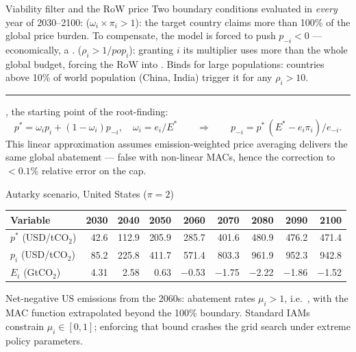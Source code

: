 \documentclass[aspectratio=169,xcolor=dvipsnames, 11pt,mathserif]{beamer}
\newcommand{\eed}{\ee\vspace{-\dimexpr 2\topsep+\parskip+\medskipamount-3pt\relax}}
\begin{document}
\begin{frame}{Viability filter and the RoW price \label{viability} \hyperlink{scenarios}{}}
\bbvs
\ip Two boundary conditions evaluated in \textit{every} year of 2030--2100:
\ip {} ($\omega_i\times\pi_i>1$): the target country claims more than 100\% of the global price burden. To compensate, the model is forced to push $p_{-i}<0$ --- economically, a .
\ip {} ($\rho_i>1/pop_i$): granting $i$ its multiplier uses more than the whole global budget, forcing the RoW into . Binds for large populations: countries above 10\% of world population (China, India) trigger it for any $\rho_i>10$.
\ip \rule{\linewidth}{0.4pt}
\ip {}, the starting point of the root-finding:
\[ p^* = \omega_i p_i + (1-\omega_i)p_{-i}, \quad \omega_i = e_i/E^* \qquad\Longrightarrow\qquad p_{-i} = p^*\,(E^*-e_i\pi_i)/e_{-i}. \]
\eed
\bbvs
\ip This linear approximation assumes emission-weighted price averaging delivers the same global abatement --- false with non-linear MACs, hence the  correction to $<0.1\%$ relative error on the cap.
\ee
\end{frame}


\begin{frame}{Autarky scenario, United States ($\pi=2$) \hyperlink{scenarios}{}}
\vspace{.4cm}
\centering
\renewcommand{\arraystretch}{1.4}
\begin{tabular}{lrrrrrrrr}
  \toprule
  \textbf{Variable} & \textbf{2030} & \textbf{2040} & \textbf{2050} & \textbf{2060} & \textbf{2070} & \textbf{2080} & \textbf{2090} & \textbf{2100} \\
  \midrule
  $p^*$ (USD/tCO$_2$) & 42.6 & 112.9 & 205.9 & 285.7 & 401.6 & 480.9 & 476.2 & 471.4 \\
  $p_i$ (USD/tCO$_2$) & 85.2 & 225.8 & 411.7 & 571.4 & 803.3 & 961.9 & 952.3 & 942.8 \\
  $E_i$ (GtCO$_2$) & 4.31 & 2.58 & 0.63 & $-$0.53 & $-$1.75 & $-$2.22 & $-$1.86 & $-$1.52 \\
  \bottomrule
\end{tabular}

\bbvs
\ip Net-negative US emissions from the 2060s: abatement rates $\mu_i>1$, i.e.\ , with the MAC function extrapolated beyond the 100\% boundary.
\ip Standard IAMs constrain $\mu_i\in[0,1]$; enforcing that bound crashes the grid search under extreme policy parameters.
\ee
\end{frame}
\end{document}
